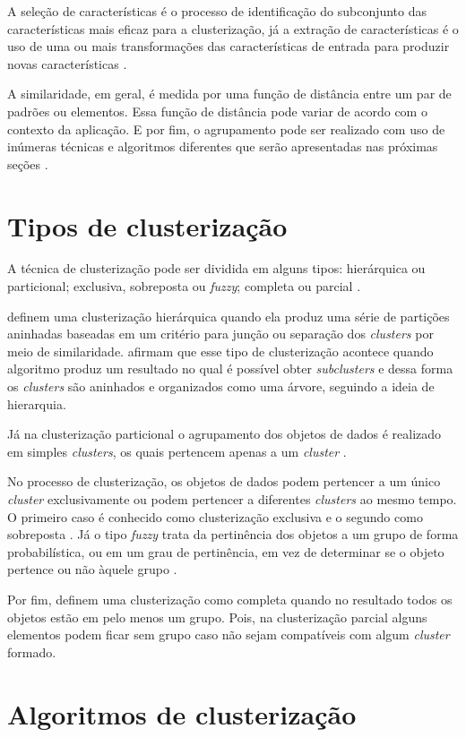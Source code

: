 A seleção de características é o processo de identificação do subconjunto das características mais eficaz para a clusterização, já a extração
de características é o uso de uma ou mais transformações das características de entrada para produzir novas características \cite{clustering_review}.

A similaridade, em geral, é medida por uma função de distância entre um par de padrões ou elementos. Essa função de distância pode variar de acordo com o contexto da aplicação. E por fim, o agrupamento pode ser realizado com uso de inúmeras técnicas e algoritmos diferentes que serão apresentadas nas próximas seções \cite{clustering_review}.

\section{Tipos de clusterização}

A técnica de clusterização pode ser dividida em alguns tipos: hierárquica ou particional; exclusiva, sobreposta ou \textit{fuzzy}; completa ou parcial \cite{tan2013data, clustering_review}. 

 definem uma clusterização hierárquica quando ela produz uma série
de partições aninhadas baseadas em um critério para junção ou separação dos \textit{clusters} por meio de similaridade.  afirmam que esse tipo de clusterização acontece quando algoritmo
produz um resultado no qual é possível obter \textit{subclusters} e dessa forma os \textit{clusters} são aninhados
e organizados como uma árvore, seguindo a ideia de hierarquia.

Já na clusterização particional o agrupamento dos objetos de dados é realizado em simples \textit{clusters}, os quais pertencem apenas a um \textit{cluster} \cite{tan2013data}.

No processo de clusterização, os objetos de dados podem pertencer a um único \textit{cluster} exclusivamente ou podem
pertencer a diferentes \textit{clusters} ao mesmo tempo. O primeiro caso é conhecido como clusterização exclusiva e o segundo como sobreposta \cite{tan2013data}. Já o tipo \textit{fuzzy} trata da pertinência dos objetos a um grupo de forma probabilística, ou em um grau de pertinência, em vez de determinar se o objeto pertence ou não àquele grupo \cite{tan2013data, clustering_review}.

Por fim,  definem uma clusterização como completa quando no resultado todos os objetos estão em pelo menos um grupo. Pois, na clusterização parcial alguns elementos podem ficar sem grupo caso não sejam compatíveis com algum \textit{cluster} formado.

\section{Algoritmos de clusterização}